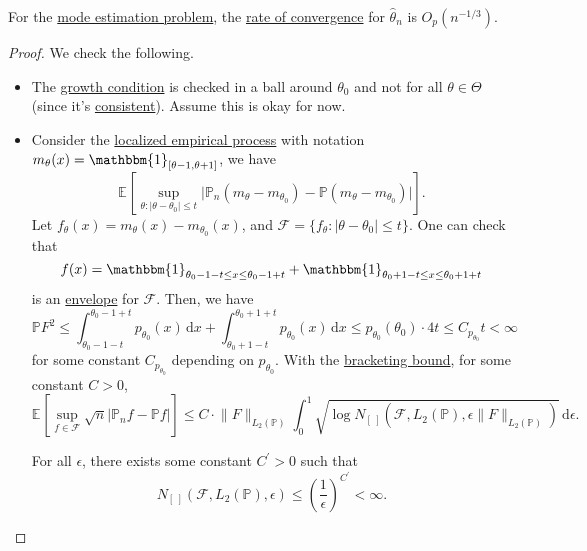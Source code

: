 \begin{proposition}\label{prop:mode-estimation-rate-of-convergence}
	For the \hyperref[eg:mode-estimation]{mode estimation problem}, the \hyperref[def:rate-of-convergence]{rate of convergence} for \(\hat{\theta} _n\) is \(O_p(n^{-1 / 3})\).
\end{proposition}
\begin{proof}
	We check the following.
	\begin{itemize}
		\item The \hyperref[def:growth-condition*]{growth condition} is checked in a ball around \(\theta _0\) and not for all \(\theta \in \Theta \) (since it's \hyperref[def:consistent]{consistent}). Assume this is okay for now.
		\item Consider the \hyperref[def:localized-EP]{localized empirical process} with notation \(m_\theta (x) = \mathbbm{1}_{[\theta -1, \theta +1]} \), we have
		      \[
			      \mathbb{E}_{}\left[\sup _{\theta \colon \vert \theta - \theta _0 \vert \leq t} \vert \mathbb{P} _n(m_\theta - m_{\theta _0}) - \mathbb{P} (m_\theta - m_{\theta _0}) \vert \right].
		      \]
		      Let \(f_\theta (x) = m_\theta (x) - m_{\theta _0}(x)\), and \(\mathscr{F} = \{ f_\theta \colon \vert \theta -\theta _0 \vert \leq t \} \). One can check that
		      \[
			      f(x) = \mathbbm{1}_{\theta _0 - 1 - t \leq x \leq \theta _0 - 1 + t} + \mathbbm{1}_{\theta _0 + 1 - t \leq x \leq \theta _0 + 1 + t}
		      \]
		      is an \hyperref[def:envelope]{envelope} for \(\mathscr{F} \). Then, we have
		      \[
			      \mathbb{P} F^2
			      \leq \int_{\theta _0 - 1 - t}^{\theta _0 - 1 + t} p_{\theta _0}(x) \,\mathrm{d}x + \int_{\theta _0 + 1 - t}^{\theta _0 + 1 + t} p_{\theta _0}(x)  \,\mathrm{d}x
			      \leq p_{\theta _0}(\theta _0) \cdot 4t
			      \leq C_{p_{\theta _0}} t
			      < \infty
		      \]
		      for some constant \(C_{p_{\theta _0}}\) depending on \(p_{\theta _0}\). With the \hyperref[thm:bracketing-bound]{bracketing bound}, for some constant \(C > 0\),
		      \[
			      \mathbb{E}_{}\left[\sup _{f\in \mathscr{F} } \sqrt{n} \vert \mathbb{P} _n f - \mathbb{P} f \vert \right]
			      \leq C\cdot \lVert F \rVert _{L_2(\mathbb{P} )} \int_{0}^{1} \sqrt{\log N_{[\ ]}(\mathscr{F} , L_2(\mathbb{P} ), \epsilon \lVert F \rVert _{L_2(\mathbb{P} )})} \,\mathrm{d}\epsilon .
		      \]
		      \begin{claim}
			      For all \(\epsilon\), there exists some constant \(C^{\prime} > 0\) such that
			      \[
				      N_{[\ ]}(\mathscr{F} , L_2(\mathbb{P} ), \epsilon )
				      \leq \left( \frac{1}{\epsilon } \right) ^{C^{\prime} } < \infty .
\]
\end{claim}
\end{itemize}
\end{proof}

